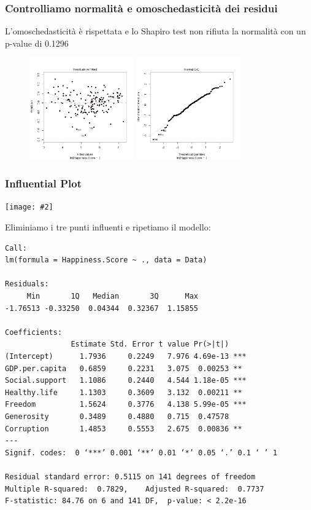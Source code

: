 \documentclass{beamer}
\newcommand{\fg}[2]{%
  \begin{center}
      \texttt{[image: \#2]}%
  \end{center}
}
\begin{document}
\begin{frame}
	\frametitle{Controlliamo normalità e omoschedasticità dei residui}
	L'omoschedasticità è rispettata e lo Shapiro test non rifiuta la normalità con un p-value di 0.1296
	\begin{figure}
	   \includegraphics[width=0.4\textwidth]{Awhic1}
	   \hfill
	   \includegraphics[width=0.4\textwidth]{Bwhic2}
	\end{figure}
\end{frame}

\begin{frame}
    \frametitle{Influential Plot}
    \fg{1}{diagram-20230701}
\end{frame}

\begin{frame}[fragile]
    Eliminiamo i tre punti influenti e ripetiamo il modello:

    \tiny
    \begin{verbatim}
Call:
lm(formula = Happiness.Score ~ ., data = Data)

Residuals:
     Min       1Q   Median       3Q      Max 
-1.76513 -0.33250  0.04344  0.32367  1.15855 

Coefficients:
               Estimate Std. Error t value Pr(>|t|)    
(Intercept)      1.7936     0.2249   7.976 4.69e-13 ***
GDP.per.capita   0.6859     0.2231   3.075  0.00253 ** 
Social.support   1.1086     0.2440   4.544 1.18e-05 ***
Healthy.life     1.1303     0.3609   3.132  0.00211 ** 
Freedom          1.5624     0.3776   4.138 5.99e-05 ***
Generosity       0.3489     0.4880   0.715  0.47578    
Corruption       1.4853     0.5553   2.675  0.00836 ** 
---
Signif. codes:  0 ‘***’ 0.001 ‘**’ 0.01 ‘*’ 0.05 ‘.’ 0.1 ‘ ’ 1

Residual standard error: 0.5115 on 141 degrees of freedom
Multiple R-squared:  0.7829,    Adjusted R-squared:  0.7737 
F-statistic: 84.76 on 6 and 141 DF,  p-value: < 2.2e-16
    \end{verbatim}
\end{frame}
\end{document}
